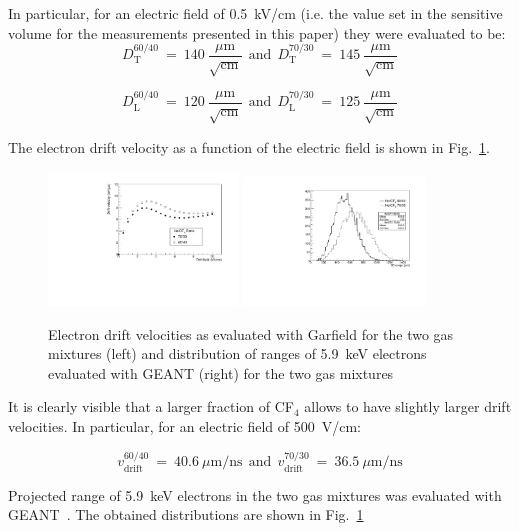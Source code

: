 \documentclass[a4paper,11pt]{article}
\begin{document}
In particular, for an electric field of 0.5~kV/cm (i.e. the value set in the sensitive volume for the measurements presented in this paper) they were evaluated to be:
$$
D_{\mathrm{T}}^{60/40}~=~140~\frac{\mu{\mathrm{m}}}{\sqrt{\mathrm{cm}}}
{\mathrm{~~and~~}} 
D_{\mathrm{T}}^{70/30}~=~145~\frac{\mu{\mathrm{m}}}{\sqrt{\mathrm{cm}}}
$$

$$
D_{\mathrm{L}}^{60/40}~=~120~\frac{\mu{\mathrm{m}}}{\sqrt{\mathrm{cm}}}
{\mathrm{~~and~~}} 
D_{\mathrm{L}}^{70/30}~=~125~\frac{\mu{\mathrm{m}}}{\sqrt{\mathrm{cm}}}
$$


The electron drift velocity as a function of the electric field is shown in Fig.~\ref{fig:drift_range}.

\begin{figure}[ht]
\centering
\includegraphics[width=0.45\textwidth]{Figures/vdrift.pdf}
\includegraphics[width=0.43\textwidth]{Figures/ER_6keV.pdf}

\caption{Electron drift velocities as evaluated with Garfield for the two gas mixtures (left) and distribution of ranges of 5.9~keV electrons evaluated with GEANT (right) for the two gas mixtures}
\label{fig:drift_range}
\end{figure}

It is clearly visible that a larger fraction of CF$_4$ allows to have slightly larger drift velocities. In particular, for an electric field of 500~V/cm:

$$
v^{60/40}_{\mathrm{drift}}~=~40.6~\mu{\mathrm{m/ns}}
{\mathrm{~~and~~}} 
v^{70/30}_{\mathrm{drift}}~=~36.5~\mu{\mathrm{m/ns}}
$$

Projected range of 5.9~keV electrons in the two gas mixtures was evaluated with GEANT~\cite{bib:geant}.
The obtained distributions are shown in Fig.~\ref{fig:drift_range}
\end{document}
